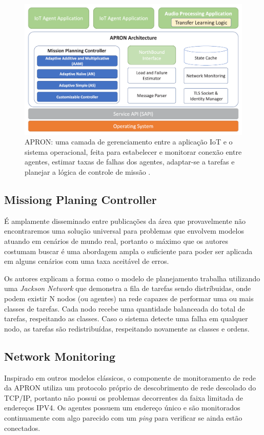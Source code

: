 \documentclass[12pt]{article}
\begin{document}
\begin{figure}[H]
    \includegraphics[width=\linewidth]{apron.png}
    \caption{APRON: uma camada de gerenciamento entre a aplicação IoT e o sistema operacional, feita para estabelecer e monitorar conexão entre agentes, estimar taxas de falhas dos agentes, adaptar-se a tarefas e planejar a lógica de controle de missão \cite{sacco}.}
\end{figure}

\subsection{Missiong Planing Controller}

É amplamente disseminado entre publicações da área que provavelmente não encontraremos uma solução universal para problemas que envolvem modelos atuando em cenários de mundo real, portanto o máximo que os autores costumam buscar é uma abordagem ampla o suficiente para poder ser aplicada em alguns cenários com uma taxa aceitável de erros.

Os autores explicam a forma como o modelo de planejamento trabalha utilizando uma \emph{Jackson Network} que demonstra a fila de tarefas sendo distríbuidas, onde podem existir N nodos (ou agentes) na rede capazes de performar uma ou mais classes de tarefas. Cada nodo recebe uma quantidade balanceada do total de tarefas, respeitando as classes. Caso o sistema detecte uma falha em qualquer nodo, as tarefas são redistribuídas, respeitando novamente as classes e ordens.

\subsection{Network Monitoring}

Inspirado em outros modelos clássicos, o componente de monitoramento de rede da APRON utiliza um protocolo próprio de descobrimento de rede descolado do TCP/IP, portanto não possui os problemas decorrentes da faixa limitada de endereços IPV4. Os agentes possuem um endereço único e são monitorados continuamente com algo parecido com um \emph{ping} para verificar se ainda estão conectados.
\end{document}
